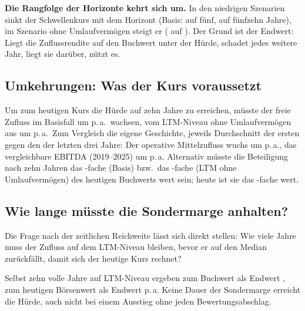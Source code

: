 \textbf{Die Rangfolge der Horizonte kehrt sich um.} In den niedrigen Szenarien sinkt der
Schwellenkurs mit dem Horizont (Basis:  auf f\"unf, 
auf f\"unfzehn Jahre), im Szenario ohne Umlaufverm\"ogen steigt er (
auf ). Der Grund ist der Endwert: Liegt die Zuflussrendite auf
den Buchwert unter der H\"urde, schadet jedes weitere Jahr, liegt sie dar\"uber, n\"utzt es.

\subsection{Umkehrungen: Was der Kurs voraussetzt}

\umkehrtabellen

Um zum heutigen Kurs die H\"urde auf zehn Jahre zu erreichen, m\"usste der freie Zufluss
im Basisfall um \WachstumMEDZehn{} p.\,a.\ wachsen, vom LTM-Niveau ohne Umlaufverm\"ogen aus
um \WachstumLTMOZehn{} p.\,a.\ Zum Vergleich die eigene Geschichte, jeweils Durchschnitt der
ersten gegen den der letzten drei Jahre: Der operative Mittelzufluss wuchs um
\CfoWachstumReal{} p.\,a., das vergleichbare EBITDA (2019--2025) um \EbitdaWachstumReal{}
p.\,a. Alternativ m\"usste die Beteiligung nach zehn Jahren das \EndwertMEDZehn-fache
(Basis) bzw.\ das \EndwertLTMOZehn-fache (LTM ohne Umlaufverm\"ogen) des heutigen Buchwerts
wert sein; heute ist sie das \EndwertHeute-fache wert.

\subsection{Wie lange m\"usste die Sondermarge anhalten?}

Die Frage nach der zeitlichen Reichweite l\"asst sich direkt stellen: Wie viele Jahre muss der
Zufluss auf dem LTM-Niveau bleiben, bevor er auf den Median zur\"uckf\"allt, damit sich der
heutige Kurs rechnet?

\dauertabelle

Selbst zehn volle Jahre auf LTM-Niveau ergeben zum Buchwert als Endwert \DauerIrrBuchZehn{},
zum heutigen B\"orsenwert als Endwert \DauerIrrMarktZehn{} p.\,a. Keine Dauer der
Sondermarge erreicht die H\"urde, auch nicht bei einem Ausstieg ohne jeden
Bewertungsabschlag. 
